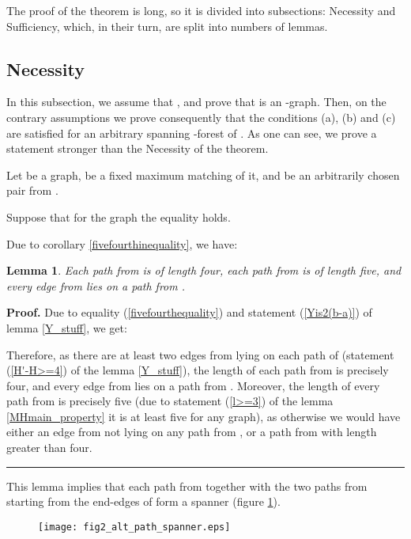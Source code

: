 \documentclass[a4paper, 12pt]{article}
\newtheorem{lemma}{Lemma}[subsection]
\newenvironment{proof}[1][Proof]{\noindent\textbf{#1.} }{\ \rule{0.5em}{0.5em}}
\begin{document}
The proof of the theorem is long, so it is divided into subsections:
Necessity and Sufficiency, which, in their turn, are split into
numbers of lemmas.


\subsection{Necessity}

In this subsection, we assume that
, and prove that  is an
-graph. Then, on the contrary assumptions we prove consequently
that the conditions (a), (b) and (c) are satisfied for an arbitrary
spanning -forest of . As one can see, we prove a statement
stronger than the Necessity of the theorem.

\bigskip

Let  be a graph,  be a fixed maximum matching of it, and
 be an arbitrarily chosen pair from .

Suppose that for the graph  the equality
 holds.

Due to corollary \ref{fivefourthinequality}, we have:
\renewcommand{\theequation}{\fnsymbol{equation}}
\setcounter{equation}{2}


\begin{lemma}\label{MH5_HH'4}
Each path from  is of length four, each path from
 is of length five, and every edge from  lies on a
path from .
\end{lemma}
\begin{proof}
Due to equality (\ref{fivefourthequality}) and statement
(\ref{Yis2(b-a)}) of lemma \ref{Y_stuff}, we get:

Therefore, as there are at least two edges from  lying on each
path of  (statement (\ref{H'-H>=4}) of the lemma
\ref{Y_stuff}), the length of each path from  is
precisely four, and every edge from  lies on a path from
. Moreover, the length of every path from 
is precisely five (due to statement (\ref{l>=3}) of the lemma
\ref{MHmain_property} it is at least five for any graph), as
otherwise we would have either an edge from  not lying on any
path from , or a path from  with length
greater than four.
\end{proof}

This lemma implies that each path  from  together
with the two paths from  starting from the end-edges of
 form a spanner (figure \ref{fig_alt_path_spanner}).

\begin{figure}[h]
\begin{center}
\texttt{[image: fig2\_alt\_path\_spanner.eps]}\\
\caption{}\label{fig_alt_path_spanner}
\end{center}
\end{figure}
\end{document}
